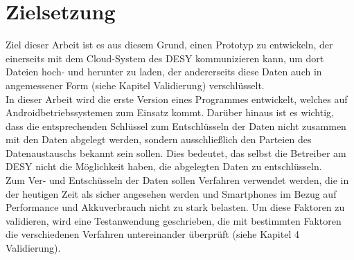 \documentclass[10pt, a4paper,headsepline]{scrreprt}
\begin{document}
\section{Zielsetzung}
Ziel dieser Arbeit ist es aus diesem Grund, einen Prototyp zu entwickeln, der einerseits mit dem Cloud-System des DESY kommunizieren kann, um dort Dateien hoch- und herunter zu laden, der andererseits diese Daten auch in angemessener Form (siehe Kapitel Validierung) verschlüsselt. \\
In dieser Arbeit wird die erste Version eines Programmes entwickelt, welches auf Androidbetriebssystemen zum Einsatz kommt. Darüber hinaus ist es wichtig, dass die entsprechenden Schlüssel zum Entschlüsseln der Daten nicht zusammen mit den Daten abgelegt werden, sondern ausschließlich den Parteien des Datenaustauschs bekannt sein sollen. Dies bedeutet, das selbst die Betreiber am DESY nicht die Möglichkeit haben, die abgelegten Daten zu entschlüsseln. \\
Zum Ver- und Entschüsseln der Daten sollen Verfahren verwendet werden, die in der heutigen Zeit als sicher angesehen werden und Smartphones im Bezug auf Performance und Akkuverbrauch nicht zu stark belasten. Um diese Faktoren zu validieren, wird eine Testanwendung geschrieben, die mit bestimmten Faktoren die verschiedenen Verfahren untereinander überprüft (siehe Kapitel 4 Validierung).



\end{document}
